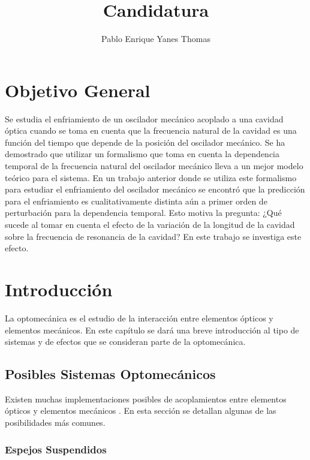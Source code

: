 \documentclass[10pt,a4paper]{report}
\author{Pablo Enrique Yanes Thomas}
\title{Candidatura}
\begin{document}
\tableofcontents
\chapter*{Objetivo General}

Se estudia el enfriamiento de un oscilador mecánico acoplado a una cavidad óptica cuando se toma en cuenta que la frecuencia natural de la cavidad  es una función del tiempo que depende de la posición del oscilador mecánico. Se ha demostrado que utilizar un formalismo que toma en cuenta la dependencia temporal de la frecuencia natural del oscilador mecánico lleva a un mejor modelo teórico para el sistema\cite{HanngiFM}. En un trabajo anterior donde se utiliza este formalismo para estudiar el enfriamiento del oscilador mecánico se encontró que la predicción para el enfriamiento es cualitativamente distinta aún a primer orden de perturbación para la dependencia temporal\cite{YanesOC}. Esto motiva la pregunta: ¿Qué sucede al tomar en cuenta el efecto de la variación de la longitud de la cavidad sobre la frecuencia de resonancia de la cavidad? En este trabajo se investiga este efecto. 


\chapter{Introducción}

La optomecánica es el estudio de la interacción entre elementos ópticos y elementos mecánicos. En este capítulo se dará una breve introducción al tipo de sistemas y de efectos que se consideran parte de la optomecánica. 


\section{Posibles Sistemas Optomecánicos}

Existen muchas implementaciones posibles de acoplamientos entre elementos ópticos y elementos mecánicos \cite{KippenberCO}. En esta sección se detallan algunas de las posibilidades más comunes.

\subsection{Espejos Suspendidos}
\end{document}
